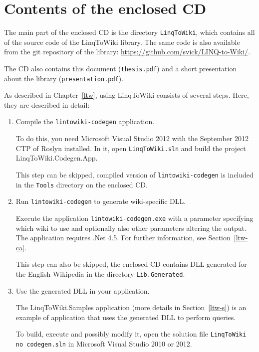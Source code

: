 \chapter{Contents of the enclosed CD}
\label{cd}

The main part of the enclosed CD is the directory \texttt{LinqToWiki},
which contains all of the source code of the LinqToWiki library.
The same code is also available from the git repository of the library:
\url{https://github.com/svick/LINQ-to-Wiki/}.

The CD also contains this document (\texttt{thesis.pdf})
and a short presentation about the library (\texttt{presentation.pdf}).


As described in Chapter~\ref{ltw}, using LinqToWiki consists of several steps.
Here, they are described in detail:

\begin{enumerate}
\item Compile the \texttt{lintowiki-codegen} application.

To do this, you need Microsoft Visual Studio 2012 with the September 2012 \ac{CTP} of Roslyn installed.
In it, open \texttt{LinqToWiki.sln} and build the project LinqToWiki.Codegen.App.

This step can be skipped, compiled version of \texttt{lintowiki-codegen} is included
in the \texttt{Tools} directory on the enclosed CD.

\item Run \texttt{lintowiki-codegen} to generate wiki-specific \ac{DLL}.

Execute the application \texttt{lintowiki-codegen.exe} with a parameter specifying which wiki
to use and optionally also other parameters altering the output.
The application requires .Net 4.5.
For further information, see Section~\ref{ltw-ca}.

This step can also be skipped, the enclosed CD contains \ac{DLL} generated for the English Wikipedia
in the directory \texttt{Lib\string\LinqToWiki.Generated}.

\item Use the generated \ac{DLL} in your application.

The LinqToWiki.Samples application (more details in Section~\ref{ltw-s}) is an example of application
that uses the generated \ac{DLL} to perform queries.

To build, execute and possibly modify it, open the solution file \texttt{LinqToWiki no codegen.sln}
in Microsoft Visual Studio 2010 or 2012.
\end{enumerate}